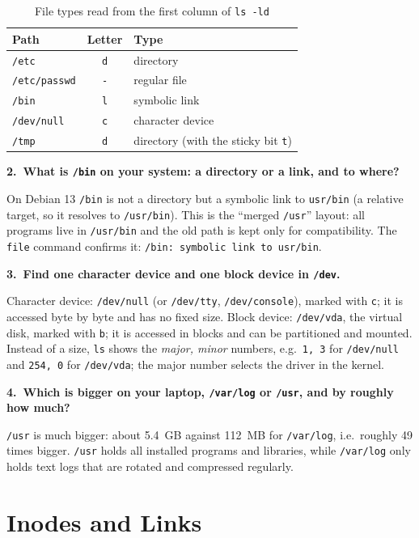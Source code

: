 \documentclass[12pt,a4paper]{article}
\newcommand{\val}[1]{#1}
\newcommand{\qa}[2]{%
  \par\needspace{5\baselineskip}\medskip
  \noindent\textbf{#1.~#2}\par\smallskip\noindent}
\begin{document}
\begin{table}[H]
  \centering
  \caption{File types read from the first column of \texttt{ls -ld}}
  \begin{tabular}{lcl}
    \toprule
    \textbf{Path} & \textbf{Letter} & \textbf{Type} \\
    \midrule
    \texttt{/etc}        & \texttt{d} & directory \\
    \texttt{/etc/passwd} & \texttt{-} & regular file \\
    \texttt{/bin}        & \texttt{l} & symbolic link \\
    \texttt{/dev/null}   & \texttt{c} & character device \\
    \texttt{/tmp}        & \texttt{d} & directory (with the sticky bit \texttt{t}) \\
    \bottomrule
  \end{tabular}
\end{table}

\qa{2}{What is \texttt{/bin} on your system: a directory or a link, and to where?}
On Debian 13 \texttt{/bin} is not a directory but a symbolic link to \texttt{usr/bin} (a relative target, so it resolves to \texttt{/usr/bin}). This is the ``merged \texttt{/usr}'' layout: all programs live in \texttt{/usr/bin} and the old path is kept only for compatibility. The \texttt{file} command confirms it: \texttt{/bin: symbolic link to usr/bin}.

\qa{3}{Find one character device and one block device in \texttt{/dev}.}
Character device: \texttt{/dev/null} (or \texttt{/dev/tty}, \texttt{/dev/console}), marked with \texttt{c}; it is accessed byte by byte and has no fixed size. Block device: \texttt{/dev/vda}, the virtual disk, marked with \texttt{b}; it is accessed in blocks and can be partitioned and mounted. Instead of a size, \texttt{ls} shows the \textit{major, minor} numbers, e.g.\ \texttt{1, 3} for \texttt{/dev/null} and \texttt{254, 0} for \texttt{/dev/vda}; the major number selects the driver in the kernel.

\qa{4}{Which is bigger on your laptop, \texttt{/var/log} or \texttt{/usr}, and by roughly how much?}
\texttt{/usr} is much bigger: about \val{5.4~GB} against \val{112~MB} for \texttt{/var/log}, i.e.\ roughly \val{49} times bigger. \texttt{/usr} holds all installed programs and libraries, while \texttt{/var/log} only holds text logs that are rotated and compressed regularly.

\newpage
\section{Inodes and Links}
\end{document}

